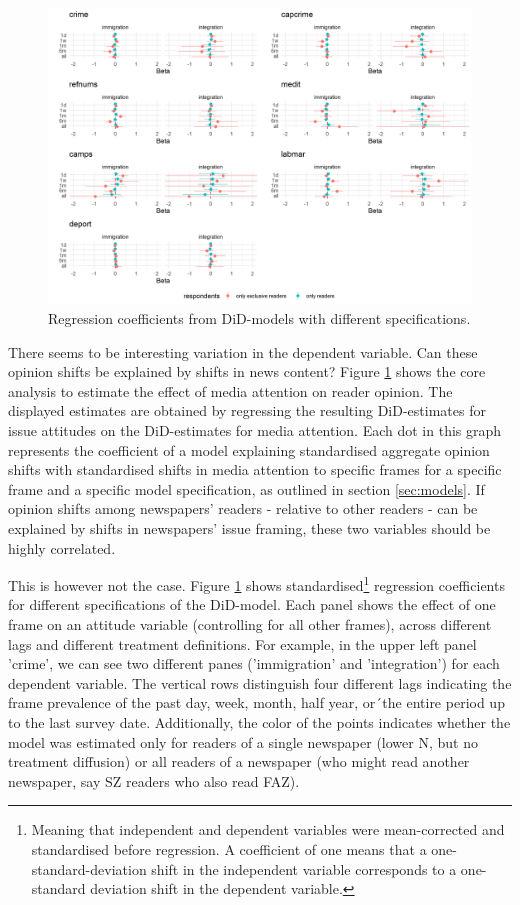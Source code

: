 \documentclass{article}
\begin{document}
\begin{figure}[!ht]
    \centering
    \includegraphics[width=1.2\textwidth]{paper/vis/effectplot_frames_did.png}
    \caption{Regression coefficients from DiD-models with different specifications.}
    \label{fig:did_corr}
\end{figure}

There seems to be interesting variation in the dependent variable. Can these opinion shifts be explained by shifts in news content? Figure \ref{fig:did_corr} shows the core analysis to estimate the effect of media attention on reader opinion. The displayed estimates are obtained by regressing the resulting DiD-estimates for issue attitudes on the DiD-estimates for media attention. Each dot in this graph represents the coefficient of a model explaining standardised aggregate opinion shifts with standardised shifts in media attention to specific frames for a specific frame and a specific model specification, as outlined in section \ref{sec:models}. If opinion shifts among newspapers' readers - relative to other readers - can be explained by shifts in newspapers' issue framing, these two variables should be highly correlated.

This is however not the case. Figure \ref{fig:did_corr} shows standardised\footnote{Meaning that independent and dependent variables were mean-corrected and standardised before regression. A coefficient of one means that a one-standard-deviation shift in the independent variable corresponds to a one-standard deviation shift in the dependent variable.} regression coefficients for different specifications of the DiD-model. Each panel shows the effect of one frame on an attitude variable (controlling for all other frames), across different lags and different treatment definitions. For example, in the upper left panel 'crime', we can see two different panes ('immigration' and 'integration') for each dependent variable. The vertical rows distinguish four different lags indicating the frame prevalence of the past day, week, month, half year, or´the entire period up to the last survey date. Additionally, the color of the points indicates whether the model was estimated only for readers of a single newspaper (lower N, but no treatment diffusion) or all readers of a newspaper (who might read another newspaper, say SZ readers who also read FAZ). 
\end{document}
